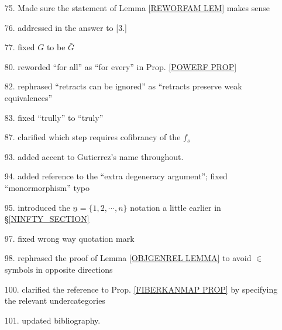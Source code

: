 \documentclass{article}
\begin{document}
\begin{itemize}
\item[75.] Made sure the statement of Lemma \ref{REWORFAM LEM} makes sense

\item[76.] addressed in the answer to [3.]

\item[77.] fixed $G$ to be $\bar{G}$
      
\item[80.] reworded ``for all'' as ``for every'' in Prop. \ref{POWERF PROP}

\item[82.] rephrased ``retracts can be ignored''
as ``retracts preserve weak equivalences''

\item[83.] fixed ``trully'' to ``truly''

\item[87.] clarified which step requires cofibrancy of the 
$f_s$

\item[93.] added accent to Gutierrez's name throughout.

\item[94.] added \cite{Ri14} reference to the ``extra degeneracy argument''; fixed ``monormorphism'' typo

\item[95.] introduced the 
$\underline{n} = \{1,2,\cdots,n\}$
notation a little earlier in \S \ref{NINFTY_SECTION}

\item[97.] fixed wrong way quotation mark

\item[98.] rephrased the proof of Lemma \ref{OBJGENREL LEMMA}
to avoid $\in$ symbols in opposite directions

\item[100.] clarified the reference to Prop. \ref{FIBERKANMAP PROP} by specifying the relevant undercategories

\item[101.] updated bibliography.

\end{itemize}








{}


\end{document}
